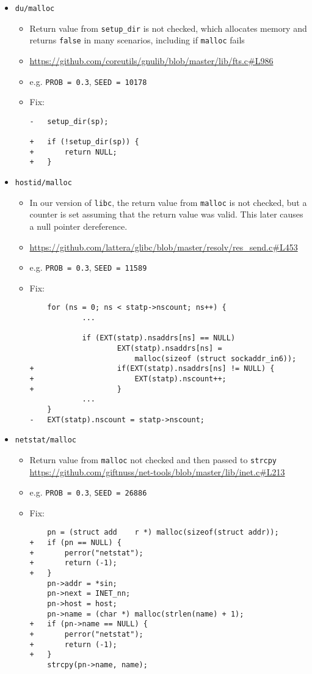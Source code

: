 \begin{itemize}

\item \texttt{du/malloc}
\begin{itemize}
\item Return value from \texttt{setup\_dir} is not checked, which allocates memory and returns \texttt{false} in many scenarios, including if \texttt{malloc} fails
\item \url{https://github.com/coreutils/gnulib/blob/master/lib/fts.c#L986}
\item e.g. \texttt{PROB = 0.3}, \texttt{SEED = 10178}
\item Fix:
\begin{lstlisting}
-	setup_dir(sp);

+	if (!setup_dir(sp)) {
+		return NULL;
+	}
\end{lstlisting}
\end{itemize}

\item \texttt{hostid/malloc}
\begin{itemize}
\item In our version of \texttt{libc}, the return value from \texttt{malloc} is not checked, but a counter is set assuming that the return value was valid. This later causes a null pointer dereference.
\item \url{https://github.com/lattera/glibc/blob/master/resolv/res_send.c#L453}
\item e.g. \texttt{PROB = 0.3}, \texttt{SEED = 11589}
\item Fix:
\begin{lstlisting}
	for (ns = 0; ns < statp->nscount; ns++) {
			...
			
	        if (EXT(statp).nsaddrs[ns] == NULL)
	                EXT(statp).nsaddrs[ns] =
	                    malloc(sizeof (struct sockaddr_in6));
+	                if(EXT(statp).nsaddrs[ns] != NULL) {
+	                	EXT(statp).nscount++;
+	                }
			...
	}
-	EXT(statp).nscount = statp->nscount;
\end{lstlisting}
\end{itemize}

\item \texttt{netstat/malloc}
\begin{itemize}
\item Return value from \texttt{malloc} not checked and then passed to \texttt{strcpy}
\url{https://github.com/giftnuss/net-tools/blob/master/lib/inet.c#L213}
\item e.g. \texttt{PROB = 0.3}, \texttt{SEED = 26886}
\item Fix:
\begin{lstlisting}
    pn = (struct add	r *) malloc(sizeof(struct addr));
+   if (pn == NULL) {
+   	perror("netstat");
+		return (-1);
+   }
    pn->addr = *sin;
    pn->next = INET_nn;
    pn->host = host;
    pn->name = (char *) malloc(strlen(name) + 1);
+   if (pn->name == NULL) {
+   	perror("netstat");
+		return (-1);
+   }
    strcpy(pn->name, name);


\end{lstlisting}
\end{itemize}
\end{itemize}
